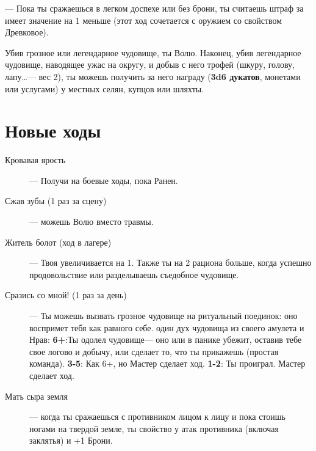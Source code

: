 \documentclass[10pt,twoside]{report}
\begin{document}
\begin{description}[noitemsep]
\pagebreak

\item[Убийца чудовищ]--- Пока ты сражаешься в легком доспехе или без
  брони, ты считаешь штраф за { имеет значение} на 1
  меньше (этот ход сочетается с оружием со свойством Древковое).

  Убив грозное или легендарное чудовище, ты { Волю}. Наконец, убив легендарное чудовище, наводящее ужас на
  округу, и добыв с него трофей (шкуру, голову, лапу\ldots--- вес 2),
  ты можешь получить за него награду (\textbf{3d6 дукатов}, монетами
  или услугами) у местных селян, купцов или шляхты.

  
\end{description}

\pagebreak

\section*{Новые ходы}
\begin{description}
\item[Кровавая ярость]--- Получи { на боевые ходы}, пока Ранен.
\item[Сжав зубы (1 раз за сцену)]--- можешь { Волю} вместо
  травмы.
\item[Житель болот (ход в лагере)]--- Твоя {
    увеличивается на 1}. Также ты { на 2 рациона
    больше}, когда успешно { продовольствие} или
  разделываешь съедобное чудовище.
\item[Сразись со мной! (1 раз за день)]--- Ты можешь вызвать грозное
  чудовище на ритуальный поединок: оно воспримет тебя как равного
  себе. { один дух чудовища из своего амулета} и
  { Нрав}: \textbf{6+}:Ты одолел чудовище--- оно или в
  панике убежит, оставив тебе свое логово и добычу, или сделает то,
  что ты прикажешь (простая команда). \textbf{3-5}: Как 6+, но Мастер
  сделает ход. \textbf{1-2}: Ты проиграл. Мастер сделает ход.
\item[Мать сыра земля]--- когда ты сражаешься с противником лицом к лицу и пока стоишь ногами на твердой земле, ты { свойство {}} у атак противника (включая заклятья) и { +1 Брони}.
\end{description}
\pagebreak
\end{document}
